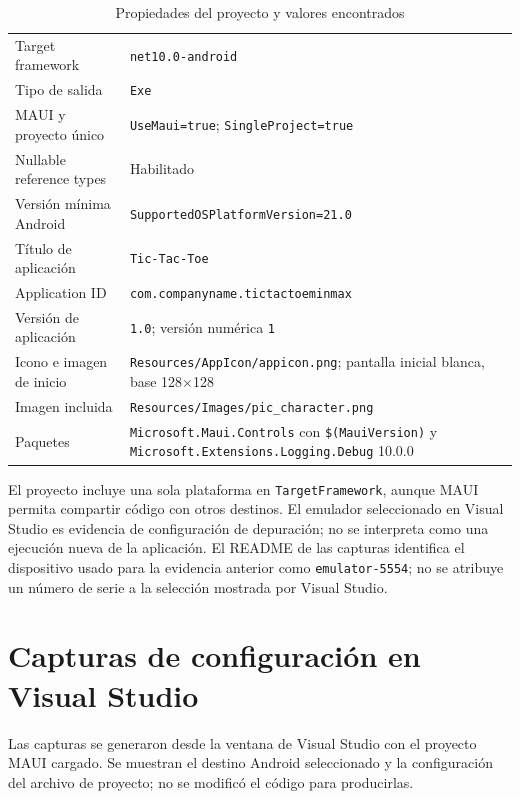 \begin{table}[H]
\centering
\caption{Propiedades del proyecto y valores encontrados}
\label{tab:config}
\begin{tabular}{P{5.0cm}P{9.8cm}}
\toprule
{} & \\
\midrule
Target framework & \texttt{net10.0-android}\\
Tipo de salida & \texttt{Exe}\\
MAUI y proyecto único & \texttt{UseMaui=true}; \texttt{SingleProject=true}\\
Nullable reference types & Habilitado\\
Versión mínima Android & \texttt{SupportedOSPlatformVersion=21.0}\\
Título de aplicación & \texttt{Tic-Tac-Toe}\\
Application ID & \texttt{com.companyname.tictactoeminmax}\\
Versión de aplicación & \texttt{1.0}; versión numérica \texttt{1}\\
Icono e imagen de inicio & \texttt{Resources/AppIcon/appicon.png}; pantalla inicial blanca, base 128$\times$128\\
Imagen incluida & \texttt{Resources/Images/pic\_character.png}\\
Paquetes & \texttt{Microsoft.Maui.Controls} con \texttt{\$(MauiVersion)} y \texttt{Microsoft.Extensions.Logging.Debug} 10.0.0\\
\bottomrule
\end{tabular}
\end{table}

El proyecto incluye una sola plataforma en \texttt{TargetFramework}, aunque MAUI permita compartir código con otros destinos. El emulador seleccionado en Visual Studio es evidencia de configuración de depuración; no se interpreta como una ejecución nueva de la aplicación. El README de las capturas identifica el dispositivo usado para la evidencia anterior como \texttt{emulator-5554}; no se atribuye un número de serie a la selección mostrada por Visual Studio.

\section{Capturas de configuración en Visual Studio}
Las capturas se generaron desde la ventana de Visual Studio con el proyecto MAUI cargado. Se muestran el destino Android seleccionado y la configuración del archivo de proyecto; no se modificó el código para producirlas.

